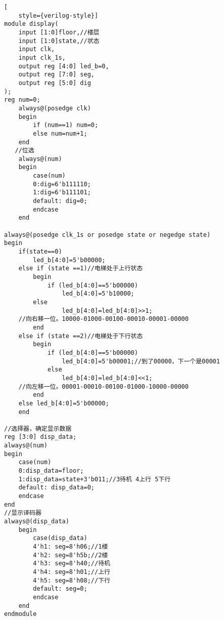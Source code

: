 \begin{lstlisting}[
    style={verilog-style}]
module display(
    input [1:0]floor,//楼层
    input [1:0]state,//状态
    input clk,
    input clk_1s,
    output reg [4:0] led_b=0,
    output reg [7:0] seg,
    output reg [5:0] dig
);
reg num=0;
	always@(posedge clk)
	begin
		if (num==1) num=0;
		else num=num+1;
	end
   //位选
	always@(num)
	begin	
		case(num)
		0:dig=6'b111110;
		1:dig=6'b111101;
		default: dig=0;
		endcase
	end
	
always@(posedge clk_1s or posedge state or negedge state)
begin
	if(state==0)
	    led_b[4:0]=5'b00000;
    else if (state ==1)//电梯处于上行状态
        begin
            if (led_b[4:0]==5'b00000)
                led_b[4:0]=5'b10000;
        else
                led_b[4:0]=led_b[4:0]>>1; 
    //向右移一位。10000-01000-00100-00010-00001-00000
        end
    else if (state ==2)//电梯处于下行状态
        begin
            if (led_b[4:0]==5'b00000)
                led_b[4:0]=5'b00001;//到了00000，下一个是00001
            else
                led_b[4:0]=led_b[4:0]<<1; 
    //向左移一位。00001-00010-00100-01000-10000-00000
        end
    else led_b[4:0]=5'b00000;
	end
	
//选择器，确定显示数据
reg [3:0] disp_data;
always@(num)
begin	
	case(num)
	0:disp_data=floor;
	1:disp_data=state+3'b011;//3待机 4上行 5下行
	default: disp_data=0;
	endcase
end	
//显示译码器
always@(disp_data)
	begin
		case(disp_data)
		4'h1: seg=8'h06;//1楼
		4'h2: seg=8'h5b;//2楼
		4'h3: seg=8'h40;//待机
		4'h4: seg=8'h01;//上行
		4'h5: seg=8'h08;//下行
		default: seg=0;
		endcase
	end
endmodule


\end{lstlisting}
